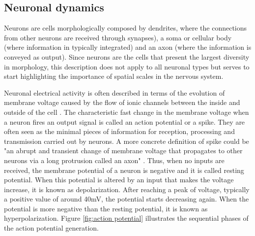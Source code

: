 \subsection{Neuronal dynamics}
Neurons are cells morphologically composed by dendrites, where the connections from other neurons are received through synapses), a soma or cellular body (where information in typically integrated) and an axon (where the information is conveyed as output). Since neurons are the cells that present the largest diversity in morphology, this description does not apply to all neuronal types but serves to start highlighting the importance of spatial scales in the nervous system. 

Neuronal electrical activity is often described in terms of the evolution of membrane voltage caused by the flow of ionic channels between the inside and outside of the cell \parencite{kandel_principles_2012}. The characteristic fast change in the membrane voltage when a neuron fires an output signal is called an action potential or a spike. They are often seen as the minimal pieces of information for reception, processing and transmission carried out by neurons. A more concrete definition of spike could be "an abrupt and transient change of membrane voltage that propagates to other neurons via a long protrusion called an axon" \parencite{izhikevich_dynamical_2007}. Thus, when no inputs are received, the membrane potential of a neuron is negative and it is called resting potential. When this potential is altered by an input that makes the voltage increase, it is known as depolarization. After reaching a peak of voltage, typically a positive value of around 40mV, the potential starts decreasing again. When the potential is more negative than the resting potential, it is known as hyperpolarization. Figure \ref{fig:action potential} illustrates the sequential phases of the action potential generation. 

